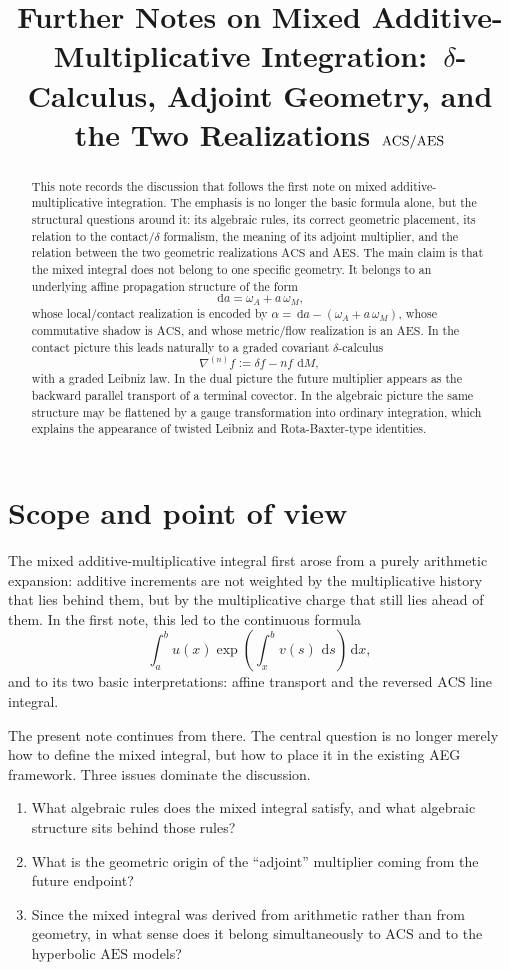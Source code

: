 \documentclass[11pt]{article}
\title{Further Notes on Mixed Additive-Multiplicative Integration:\
$\delta$-Calculus, Adjoint Geometry, and the Two Realizations $\ACS/\AES$}
\author{}
\date{}
\newcommand{\dd}{\,\mathrm{d}}
\newcommand{\ACS}{\mathrm{ACS}}
\newcommand{\AES}{\mathrm{AES}}
\newcommand{\del}{\delta}
\newcommand{\nab}{\nabla}
\begin{document}
\maketitle

\begin{abstract}
This note records the discussion that follows the first note on mixed additive-multiplicative integration. The emphasis is no longer the basic formula alone, but the structural questions around it: its algebraic rules, its correct geometric placement, its relation to the contact/$\delta$ formalism, the meaning of its adjoint multiplier, and the relation between the two geometric realizations $\ACS$ and $\AES$. The main claim is that the mixed integral does not belong to one specific geometry. It belongs to an underlying affine propagation structure of the form
\[
\dd a=\omega_A+a\,\omega_M,
\]
whose local/contact realization is encoded by $\alpha=\dd a-(\omega_A+a\,\omega_M)$, whose commutative shadow is $\ACS$, and whose metric/flow realization is an $\AES$. In the contact picture this leads naturally to a graded covariant $\delta$-calculus
\[
\nab^{(n)}f:=\del f-nf\,\dd M,
\]
with a graded Leibniz law. In the dual picture the future multiplier appears as the backward parallel transport of a terminal covector. In the algebraic picture the same structure may be flattened by a gauge transformation into ordinary integration, which explains the appearance of twisted Leibniz and Rota-Baxter-type identities.
\end{abstract}

\section{Scope and point of view}

The mixed additive-multiplicative integral first arose from a purely arithmetic expansion: additive increments are not weighted by the multiplicative history that lies behind them, but by the multiplicative charge that still lies ahead of them. In the first note, this led to the continuous formula
\[
\int_a^b u(x)\exp\!\left(\int_x^b v(s)\,\dd s\right)\dd x,
\]
and to its two basic interpretations: affine transport and the reversed $\ACS$ line integral.

The present note continues from there. The central question is no longer merely how to define the mixed integral, but how to place it in the existing AEG framework. Three issues dominate the discussion.
\begin{enumerate}[leftmargin=1.5em]
\item What algebraic rules does the mixed integral satisfy, and what algebraic structure sits behind those rules?
\item What is the geometric origin of the ``adjoint'' multiplier coming from the future endpoint?
\item Since the mixed integral was derived from arithmetic rather than from geometry, in what sense does it belong simultaneously to $\ACS$ and to the hyperbolic $\AES$ models?
\end{enumerate}
\end{document}
